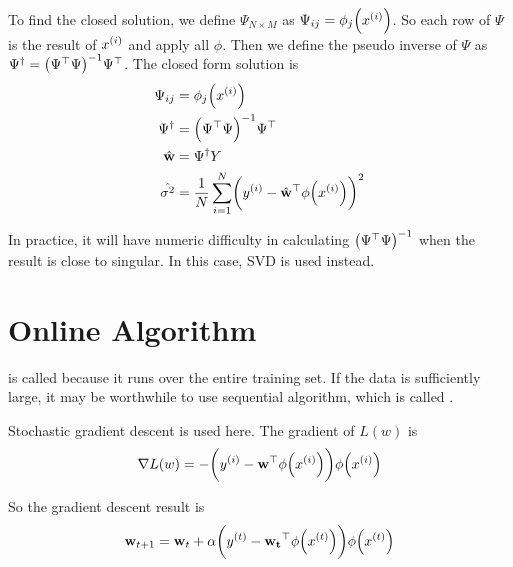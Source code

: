To find the closed solution, we define $\Psi_{N \times M}$ as $\Psi_{ij} = \phi_j \mleft(\selectonesample{x}{i}\mright)$. So each row of $\Psi$ is the result of ${x}^{(i)}$ and apply all $\phi$. Then we define the pseudo inverse of $\Psi$ as $\pseudoinverse{\Psi} = \inverse{\mleft(\transpose{\Psi} \Psi\mright)} \transpose{\Psi}$. The closed form solution is
\begin{equation}\label{closed_simple_linear_regression_solution}
    \begin{aligned}
        \Psi_{ij} &= \phi_j \mleft(\selectonesample{x}{i}\mright) \\
        \pseudoinverse{\Psi} &= \inverse{\mleft(\transpose{\Psi} \Psi\mright)} \transpose{\Psi} \\
        \estimation{\feature{w}} &= \pseudoinverse{\Psi} Y \\
        \estimation{\sigma^2} &= \frac{1}{N} \sum_{i=1}^N \mleft( \selectonesample{y}{i} - \transpose{\estimation{\feature{w}}} \phi\mleft( \selectonesample{x}{i} \mright) \mright)^2
    \end{aligned}
\end{equation}


In practice, it will have numeric difficulty in calculating $\inverse{\mleft(\transpose{\Psi} \Psi\mright)}$ when the result is close to singular. In this case, SVD is used instead.


\section{Online Algorithm}

 is called  because it runs over the entire training set. If the data is sufficiently large, it may be worthwhile to use sequential algorithm, which is called .

Stochastic gradient descent is used here. The gradient of $L(w)$ is
\begin{equation}
    \nabla L(w) = - \mleft( \selectonesample{y}{i} - \transpose{\feature{w}} \phi\mleft(\selectonesample{x}{i}\mright) \mright) \phi\mleft(\selectonesample{x}{i}\mright)
\end{equation}

So the gradient descent result is
\begin{equation}
    \feature{w}_{t+1} = \feature{w}_t + \alpha \mleft( \selectonesample{y}{t} - \transpose{\feature{w_t}} \phi\mleft(\selectonesample{x}{t}\mright) \mright) \phi\mleft(\selectonesample{x}{t}\mright)
\end{equation}


